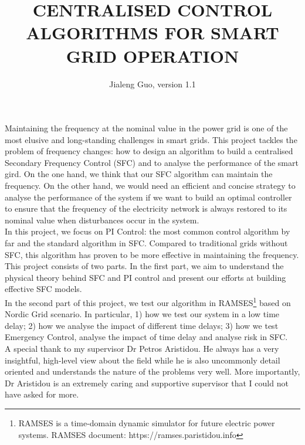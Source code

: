 \documentclass{report}
\begin{document}
\title{CENTRALISED CONTROL ALGORITHMS FOR SMART GRID OPERATION}
\author{Jialeng Guo, version 1.1}

\beforepreface
{}
Maintaining the frequency at the nominal value in the power grid is one of the most elusive and long-standing challenges in smart grids. This project tackles the problem of frequency changes: how to design an algorithm to build a centralised Secondary Frequency Control (SFC) and to analyse the performance of the smart gird. On the one hand, we think that our SFC algorithm can maintain the frequency. On the other hand, we would need an efficient and concise strategy to analyse the performance of the system if we want to build an optimal controller to ensure that the frequency of the electricity network is always restored to its nominal value when disturbances occur in the system.\\

In this project, we focus on PI Control: the most common control algorithm by far and the standard algorithm in SFC. Compared to traditional grids without SFC, this algorithm has proven to be more effective in maintaining the frequency.\\

This project consists of two parts. In the first part, we aim to understand the physical theory behind SFC and PI control and present our efforts at building effective SFC models.\\

In the second part of this project, we test our algorithm in RAMSES\textcolor{red}{\footnote{RAMSES is a time-domain dynamic simulator for future electric power systems. RAMSES document: https://ramses.paristidou.info}} based on Nordic Grid scenario. In particular, 1) how we test our system in a low time delay; 2) how we analyse the impact of different time delays; 3) how we test Emergency Control, analyse the impact of time delay and analyse risk in SFC.\\

A special thank to my supervisor Dr Petros Aristidou. He always has a very insightful, high-level view about the field while he is also uncommonly detail oriented and understands the nature of the problems very well. More importantly, Dr Aristidou is an extremely caring and supportive supervisor that I could not have asked for more.\\
\end{document}
